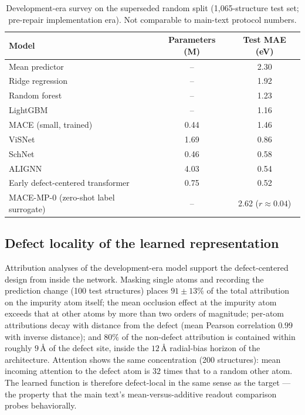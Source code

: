\documentclass[aps,prb,onecolumn,superscriptaddress,floatfix]{revtex4-2}
\begin{document}
\begin{table}[h!]
\caption{Development-era survey on the superseded random split
(1{,}065-structure test set; pre-repair implementation era).  Not
comparable to main-text protocol numbers.}
\label{tab:dev_survey}
\centering
\begin{tabular}{lcc}
\toprule
Model & Parameters (M) & Test MAE (eV) \\
\midrule
Mean predictor & -- & 2.30 \\
Ridge regression & -- & 1.92 \\
Random forest & -- & 1.23 \\
LightGBM & -- & 1.16 \\
MACE (small, trained) & 0.44 & 1.46 \\
ViSNet & 1.69 & 0.86 \\
SchNet & 0.46 & 0.58 \\
ALIGNN & 4.03 & 0.54 \\
Early defect-centered transformer & 0.75 & 0.52 \\
\midrule
MACE-MP-0 (zero-shot label surrogate) & -- & 2.62 ($r\approx0.04$) \\
\bottomrule
\end{tabular}
\end{table}

\subsection{Defect locality of the learned representation}

Attribution analyses of the development-era model support the
defect-centered design from inside the network.  Masking single atoms and
recording the prediction change (100 test structures) places
$91\pm13\%$ of the total attribution on the impurity atom itself; the
mean occlusion effect at the impurity atom exceeds that at other atoms by
more than two orders of magnitude; per-atom attributions decay with
distance from the defect (mean Pearson correlation $0.99$ with inverse
distance); and $80\%$ of the non-defect attribution is contained within
roughly $9$\,\AA{} of the defect site, inside the $12$\,\AA{}
radial-bias horizon of the architecture.  Attention shows the same
concentration (200 structures): mean incoming attention to the defect atom
is $32$ times that to a random other atom.  The learned function is
therefore defect-local in the same sense as the target --- the property
that the main text's mean-versus-additive readout comparison probes
behaviorally.
\end{document}
